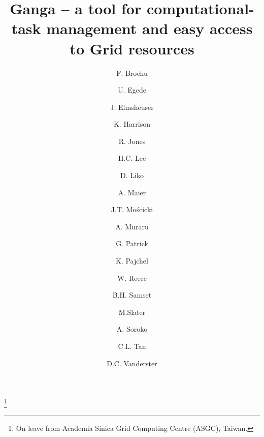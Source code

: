 \documentclass{elsart}
\def\grid {Grid\xspace}
\begin{document}
\begin{frontmatter}




\title{Ganga -- a tool for computational-task management and easy access to \grid
  resources}




\author[a:Cambridge]{F. Brochu}
\author[a:Imperial]{U. Egede}
\author[a:Munich]{J. Elmsheuser}
\author[a:Cambridge]{K. Harrison}
\author[a:Lancaster]{R. Jones}
\author[a:CERN]{H.C. Lee}
\author[a:CERN]{D. Liko}
\author[a:CERN]{A. Maier}
\author[a:CERN]{J.T. Mo{\'s}cicki}
\author[a:CERN]{A. Muraru}
\author[a:STFC]{G. Patrick}
\author[a:Oslo]{K. Pajchel}
\author[a:Imperial]{W. Reece}
\author[a:Oslo]{B.H. Samset}
\author[a:?]{M.Slater}
\author[a:Oxford]{A. Soroko}
\author[a:Birmingham]{C.L. Tan}
\author[a:CERN]{D.C. Vanderster}

\address[a:Cambridge]{University of Cambridge, Cambridge, United Kingdom}
\address[a:Imperial]{Imperial College London, London, United Kingdom}
\address[a:Munich]{Ludwig-Maximilians-Universit\"{a}t, M\"{u}nchen, Germany}
\address[a:Lancaster]{Lancaster University, Lancaster, United Kingdom}
\address[a:CERN]{CERN, Geneva, Switzerland}
\address[a:STFC]{Science \& Technology Facilities Council, United Kingdom}
\address[a:Oxford]{University of Oxford, Oxford, United Kingdom}
\address[a:Birmingham]{University of Birmingham, Birmingham, United Kingdom}
\address[a:Oslo]{University of Oslo, Oslo, Norway}

\thanks[HurngChun]{On leave from Academia Sinica Grid Computing Centre (ASGC),
  Taiwan.}


\end{frontmatter}
\end{document}
